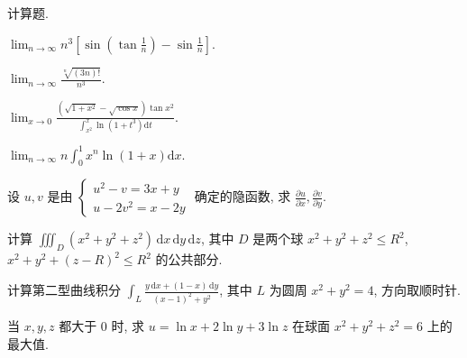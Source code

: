 \par{}
计算题.\par
$\lim_{n\to \infty}n^3\left[\sin \left(\tan \frac{1}{n}\right) - \sin \frac{1}{n}\right].$\par
$\lim_{n\to\infty}\frac{\sqrt[n]{(3n)!}}{n^{3}}.$\par
\par
$\lim_{x\to 0}\frac{(\sqrt{1 + x^2} - \sqrt{\cos x})\tan x^2}{\int_{x^2}^x\ln(1 + t^3)\mathrm{d}t}.$\par
$\lim_{n\to \infty}n\int_0^1 x^n\ln (1 + x)\mathrm{d}x.$\par
设 $u, v$ 是由 $\left\{ \begin{array}{l} u^2 - v = 3x + y \\ u - 2v^2 = x - 2y \end{array} \right.$ 确定的隐函数, 求 $\frac{\partial u}{\partial x}, \frac{\partial v}{\partial y}$.\par
计算 $\iiint_{D} (x^{2} + y^{2} + z^{2}) \, \mathrm{d}x \, \mathrm{d}y \, \mathrm{d}z$, 其中 $D$ 是两个球 $x^{2} + y^{2} + z^{2} \leq R^{2}$, $x^{2} + y^{2} + (z - R)^{2} \leq R^{2}$ 的公共部分.\par
计算第二型曲线积分 $\int_{L} \frac{y \, \mathrm{d}x + (1 - x) \, \mathrm{d}y}{(x - 1)^2 + y^2}$, 其中 $L$ 为圆周 $x^2 + y^2 = 4$, 方向取顺时针.\par
\par{}
当 $x, y, z$ 都大于 0 时, 求 $u = \ln x + 2\ln y + 3\ln z$ 在球面 $x^{2} + y^{2} + z^{2} = 6$ 上的最大值.\par
